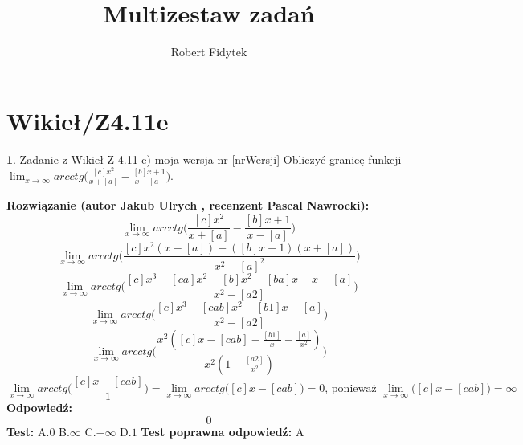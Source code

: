 \documentclass[12pt, a4paper]{article}
\title{Multizestaw zadań}
\author{Robert Fidytek}
\date{}
\theoremstyle{definition} %
\newtheorem{zad}{}
\newcommand{\kategoria}[1]{\section{#1}} %
\newcommand{\zadStart}[1]{\begin{zad}#1\newline} %
\newcommand{\zadStop}{\end{zad}}   %
\newcommand{\rozwStart}[2]{\noindent \textbf{Rozwiązanie (autor #1 , recenzent #2): }\newline} %
\newcommand{\rozwStop}{\newline}                                            %
\newcommand{\odpStart}{\noindent \textbf{Odpowiedź:}\newline}    %
\newcommand{\odpStop}{\newline}                                             %
\newcommand{\testStart}{\noindent \textbf{Test:}\newline} %
\newcommand{\testStop}{\newline} %
\newcommand{\kluczStart}{\noindent \textbf{Test poprawna odpowiedź:}\newline} %
\newcommand{\kluczStop}{\newline} %
\begin{document}
\maketitle


\kategoria{Wikieł/Z4.11e}
\zadStart{Zadanie z Wikieł Z 4.11 e) moja wersja nr [nrWersji]}
Obliczyć granicę funkcji $\lim_{x \to \infty}arcctg\big(\frac{[c]x^{2}}{x+[a]}-\frac{[b]x+1}{x-[a]}\big)$.
\zadStop
\rozwStart{Jakub Ulrych}{Pascal Nawrocki}
$$\lim_{x \to \infty}arcctg\bigg(\frac{[c]x^{2}}{x+[a]}-\frac{[b]x+1}{x-[a]}\bigg)$$
$$\lim_{x \to \infty}arcctg\bigg(\frac{[c]x^{2}(x-[a])-([b]x+1)(x+[a])}{x^{2}-[a]^{2}}\bigg)$$
$$\lim_{x \to \infty}arcctg\bigg(\frac{[c]x^{3}-[ca]x^{2}-[b]x^{2}-[ba]x-x-[a]}{x^{2}-[a2]}\bigg)$$
$$\lim_{x \to \infty}arcctg\bigg(\frac{[c]x^{3}-[cab]x^{2}-[b1]x-[a]}{x^{2}-[a2]}\bigg)$$
$$\lim_{x \to \infty}arcctg\bigg(\frac{x^{2}([c]x-[cab]-\frac{[b1]}{x}-\frac{[a]}{x^{2}})}{x^{2}(1-\frac{[a2]}{x^{2}})}\bigg)$$
$$\lim_{x \to \infty}arcctg\bigg(\frac{[c]x-[cab]}{1}\bigg)=\lim_{x \to \infty}arcctg\bigg([c]x-[cab]\bigg)=0\text{, ponieważ }\lim_{x \to \infty}\bigg([c]x-[cab]\bigg)=\infty$$
\rozwStop
\odpStart
$$0$$
\odpStop
\testStart
A.$0$
B.$\infty$
C.$-\infty$
D.$1$
\testStop
\kluczStart
A
\kluczStop
\end{document}

